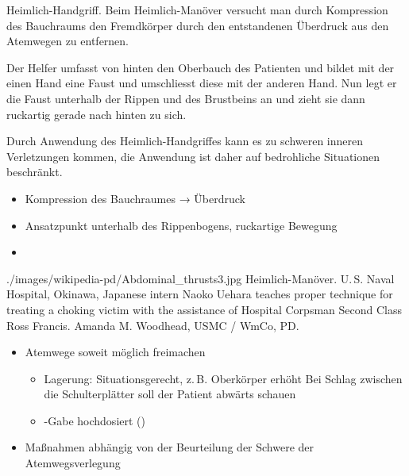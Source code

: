 {
{%
\label{topic:heimlich-manoever}%
 Heimlich-Handgriff. Beim Heimlich-Manöver
versucht man durch Kompression des Bauchraums den Fremdkörper
durch den entstandenen Überdruck aus den Atemwegen zu
entfernen.

Der Helfer umfasst von hinten den Oberbauch des Patienten und
bildet mit der einen Hand eine Faust und umschliesst diese
mit der anderen Hand. Nun legt er die Faust unterhalb der
Rippen und des Brustbeins an und zieht sie dann ruckartig
gerade nach hinten zu sich.

 Durch Anwendung des
Heimlich-Handgriffes kann es zu schweren inneren Verletzungen
kommen, die Anwendung ist daher auf bedrohliche Situationen
beschränkt.
}{%
\begin{itemize}
  \item Kompression des Bauchraumes → Überdruck
  \item Ansatzpunkt unterhalb des Rippenbogens, ruckartige Bewegung
  \item {}
\end{itemize}
}
{./images/wikipedia-pd/Abdominal_thrusts3.jpg}
{Heimlich-Manöver.}
{U.\,S. Naval Hospital, Okinawa, Japanese intern Naoko Uehara teaches
proper technique for treating a choking victim with the assistance of Hospital
Corpsman Second Class Ross Francis. Amanda M. Woodhead, USMC / WmCo, PD.}










\begin{WidePar}
{%
\begin{itemize}
  \item Atemwege soweit möglich freimachen
  \begin{itemize}
    \item 
    Lagerung: Situationsgerecht, z.\,B. Oberkörper erhöht
%     
    Bei Schlag
    zwischen die Schulterplätter soll der Patient abwärts schauen
    \item  {}-Gabe hochdosiert (\LPerMin*)
  \end{itemize}
  \item Maßnahmen abhängig von der Beurteilung der Schwere der
  Atemwegsverlegung\:
\end{itemize}

}
\end{WidePar}}
